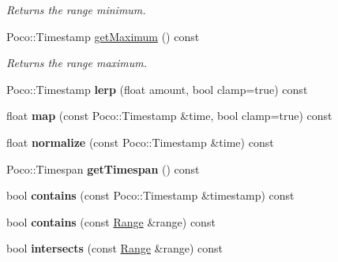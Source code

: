 \begin{DoxyCompactItemize}
\begin{DoxyCompactList}\small\item\em Returns the range minimum. \end{DoxyCompactList}\item 
\hypertarget{classofx_1_1_time_1_1_range_a3cb61178b147cff3287d59e6b65134ba}{Poco\-::\-Timestamp \hyperlink{classofx_1_1_time_1_1_range_a3cb61178b147cff3287d59e6b65134ba}{get\-Maximum} () const }\label{classofx_1_1_time_1_1_range_a3cb61178b147cff3287d59e6b65134ba}

\begin{DoxyCompactList}\small\item\em Returns the range maximum. \end{DoxyCompactList}\item 
\hypertarget{classofx_1_1_time_1_1_range_a1a64e2ff88fb9dabf23e4d7cf29d5273}{Poco\-::\-Timestamp {\bfseries lerp} (float amount, bool clamp=true) const }\label{classofx_1_1_time_1_1_range_a1a64e2ff88fb9dabf23e4d7cf29d5273}

\item 
\hypertarget{classofx_1_1_time_1_1_range_a167a600fa229c0b33e85a44b0cc6c4eb}{float {\bfseries map} (const Poco\-::\-Timestamp \&time, bool clamp=true) const }\label{classofx_1_1_time_1_1_range_a167a600fa229c0b33e85a44b0cc6c4eb}

\item 
\hypertarget{classofx_1_1_time_1_1_range_a7f86328226a89c4f8de7876b5993390a}{float {\bfseries normalize} (const Poco\-::\-Timestamp \&time) const }\label{classofx_1_1_time_1_1_range_a7f86328226a89c4f8de7876b5993390a}

\item 
\hypertarget{classofx_1_1_time_1_1_range_a4bcf46a4d880ec811592cd2ab63a1740}{Poco\-::\-Timespan {\bfseries get\-Timespan} () const }\label{classofx_1_1_time_1_1_range_a4bcf46a4d880ec811592cd2ab63a1740}

\item 
\hypertarget{classofx_1_1_time_1_1_range_a5e01715f942744988458fde71ea40491}{bool {\bfseries contains} (const Poco\-::\-Timestamp \&timestamp) const }\label{classofx_1_1_time_1_1_range_a5e01715f942744988458fde71ea40491}

\item 
\hypertarget{classofx_1_1_time_1_1_range_a1820ddf102473668482ea9a1c03ad214}{bool {\bfseries contains} (const \hyperlink{classofx_1_1_time_1_1_range}{Range} \&range) const }\label{classofx_1_1_time_1_1_range_a1820ddf102473668482ea9a1c03ad214}

\item 
\hypertarget{classofx_1_1_time_1_1_range_ae6b022bd53084f1bc343cc7631a69184}{bool {\bfseries intersects} (const \hyperlink{classofx_1_1_time_1_1_range}{Range} \&range) const }\label{classofx_1_1_time_1_1_range_ae6b022bd53084f1bc343cc7631a69184}

\end{DoxyCompactItemize}
